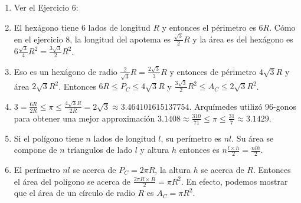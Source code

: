 \begin{enumerate}
\item Ver el Ejercicio 6:

\begin{center}
\end{center}


\item El hexágono tiene $6$ lados de longitud $R$ y entonces el
  périmetro es $6R$. Cómo en el ejercicio 8, 
  la longitud del apotema es $\frac{\sqrt{3}}{2} R$ y 
  la área es del hexágono
  es $6 \frac{\sqrt{3}}{4} R^2 = \frac{3 \sqrt{3}}{2} R^2$.
\item Eso es un hexágono de radio
  ${\frac{2}{\sqrt{3}} R}={\frac{2\sqrt{3}}{3} R}$ y entonces
  de périmetro $4 \sqrt{3} R$ y área $2 \sqrt{3} R^2$.
  Entonces $6R \leq P_C \leq 4 \sqrt{3} R$ y
  $\frac{3 \sqrt{3}}{2} R^2 \leq A_C \leq 2 \sqrt{3} R^2$.
\item $3 = \frac{6R}{2R} \leq \pi \leq \frac{4 \sqrt{3} R}{2R} = 2\sqrt{3} \approx 3.464101615137754$.
  Arquímedes utilizó $96$-gonos para obtener una mejor approximación
  $3.1408 \approx \frac{310}{71} \leq \pi \leq \frac{31}{7} \approx 3.1429$.
\item Si el polígono tiene $n$ lados de longitud $l$, su perímetro es $nl$.
  Su área se compone de $n$ tríangulos de lado $l$ y altura $h$ entonces
  es $n \frac{l \times h}{2} = \frac{nlh}{2}$.

\item El perímetro $nl$ se acerca de $P_C = 2 \pi R$, la altura $h$ se acerca
  de $R$. Entonces el área del polígono se acerca de
  $\frac{2 \pi R \times R}{2} = \pi R^2$. En efecto, podemos mostrar que
  el área de un círculo de radio $R$ es $A_C = \pi R^2$.
\end{enumerate}
